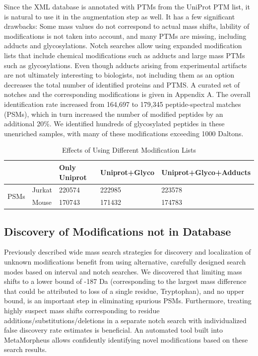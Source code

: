 \documentclass[journal=jprobs,manuscript=article]{achemso}
\begin{document}
Since the XML database is annotated with PTMs from the UniProt PTM list, it is natural to use it in the augmentation step as well.
It has a few significant drawbacks: Some mass values do not correspond to actual mass shifts, lability of modifications is not taken into account, and many PTMs are missing, including adducts and glycosylations.
Notch searches allow using expanded modification lists that include chemical modifications such as adducts and large mass PTMs such as glycosylations.
Even though adducts arising from experimental artifacts are not ultimately interesting to biologists, not including them as an option decreases the total number of identified proteins and PTMS.
A curated set of notches and the corresponding modifications is given in Appendix A.
The overall identification rate increased from 164,697 to 179,345 peptide-spectral matches (PSMs), which in turn increased the number of modified peptides by an additional 20\%.
We identified hundreds of glycosylated peptides in these unenriched samples, with many of these modifications exceeding 1000 Daltons. 

\begin{table}[]
\centering
\caption{Effects of Using Different Modification Lists}
\label{tab:table3}
\begin{tabular}{ll|l|l|l}
                      &        & Only Uniprot & Uniprot+Glyco & Uniprot+Glyco+Adducts\\
\hline
\multirow{2}{*}{PSMs} & Jurkat  & 220574   &  222985 & 223578\\
                      & Mouse    & 170743   &   171432& 174783 
\end{tabular}
\end{table}


\subsection{Discovery of Modifications not in Database}

Previously described wide mass search strategies for discovery and localization of unknown modifications benefit from using alternative, carefully designed search modes based on interval and notch searches.
We discovered that limiting mass shifts to a lower bound of -187 Da (corresponding to the largest mass difference that could be attributed to loss of a single residue, Tryptophan), and no upper bound, is an important step in eliminating spurious PSMs.
Furthermore, treating highly suspect mass shifts corresponding to residue additions/substitutions/deletions in a separate notch search with individualized false discovery rate estimates is beneficial.
An automated tool built into MetaMorpheus allows confidently identifying novel modifications based on these search results.
\end{document}
